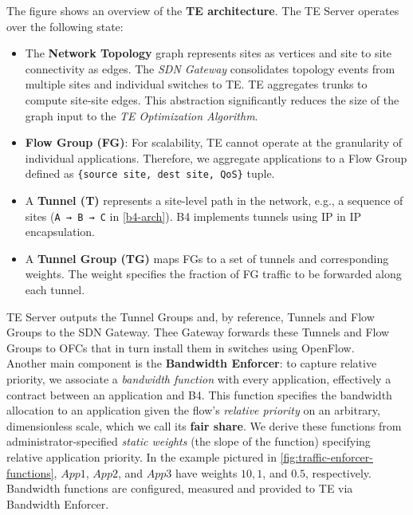\documentclass[10pt,a4paper]{report}
\theoremstyle{definition}
\begin{document}
The figure shows an overview of the \textbf{TE architecture}. The TE Server operates over the following state:
\begin{itemize}
	\item 
	The \textbf{Network Topology} graph represents sites as vertices and site to site connectivity as edges. The \textit{SDN Gateway} consolidates topology events from multiple sites and individual switches to TE. TE aggregates trunks to compute site-site edges. This abstraction significantly reduces the size of the graph input to the \textit{TE Optimization Algorithm}.
	\item 
	\textbf{Flow Group (FG)}: For scalability, TE cannot operate at the granularity of individual applications. Therefore, we aggregate applications to a Flow Group defined as \texttt{\{source site, dest site, QoS\}} tuple.
	\item 
	A \textbf{Tunnel (T)} represents a site-level path in the network, e.g., a sequence of sites (\texttt{A → B → C} in \ref{b4-arch}). B4 implements tunnels using IP in IP encapsulation.
	\item 
	A \textbf{Tunnel Group (TG)} maps FGs to a set of tunnels and corresponding weights. The weight specifies the fraction of FG traffic to be forwarded along each tunnel.
\end{itemize}
TE Server outputs the Tunnel Groups and, by reference, Tunnels and Flow Groups to the SDN Gateway. Thee Gateway forwards these Tunnels and Flow Groups to OFCs that in turn install them in switches using OpenFlow.\\
Another main component is the \textbf{Bandwidth Enforcer}:  to capture relative priority, we associate a \textit{bandwidth function} with every application, effectively a contract between an application and B4. This function specifies the bandwidth allocation to an application given the flow’s \textit{relative priority} on an arbitrary, dimensionless scale, which we call its \textbf{fair share}.
We derive these functions from administrator-specified \textit{static weights} (the slope of the function) specifying relative application priority. In the example pictured in \ref{fig:traffic-enforcer-functions}, $App1$, $App2$, and $App3$ have weights $10, 1$, and $0.5$, respectively. Bandwidth functions are configured, measured and provided to TE via Bandwidth Enforcer.
\end{document}
